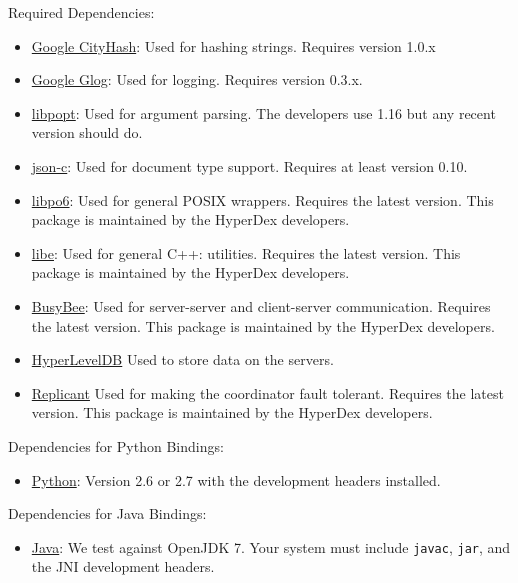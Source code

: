 Required Dependencies:

\begin{itemize}
\item \href{http://code.google.com/p/cityhash/}{Google CityHash}:  Used for
    hashing strings.  Requires version 1.0.x
\item \href{http://code.google.com/p/google-glog/}{Google Glog}:  Used for
    logging.  Requires version 0.3.x.
\item \href{http://rpm5.org/}{libpopt}: Used for argument parsing.  The
    developers use 1.16 but any recent version should do.
\item \href{https://github.com/json-c/json-c}{json-c}:  Used for document type
    support.  Requires at least version 0.10.
\item \href{http://hyperdex.org/downloads/}{libpo6}: Used for general POSIX
    wrappers.  Requires the latest version.  This package is maintained by the
    HyperDex developers.
\item \href{http://hyperdex.org/downloads/}{libe}: Used for general C++:
    utilities.  Requires the latest version.  This package is maintained by the
    HyperDex developers.
\item \href{http://hyperdex.org/downloads/}{BusyBee}: Used for server-server
    and client-server communication.  Requires the latest version.  This package
    is maintained by the HyperDex developers.
\item \href{http://hyperdex.org/downloads/}{HyperLevelDB}  Used to store data
    on the servers.
\item \href{http://hyperdex.org/downloads/}{Replicant} Used for making the
    coordinator fault tolerant.  Requires the latest version.  This package is
    maintained by the HyperDex developers.
\end{itemize}

Dependencies for Python Bindings:

\begin{itemize}
\item \href{http://python.org/}{Python}: Version 2.6 or 2.7 with the
    development headers installed.
\end{itemize}

Dependencies for Java Bindings:

\begin{itemize}
\item \href{http://openjdk.java.net/}{Java}: We test against OpenJDK 7.  Your
    system must include \texttt{javac}, \texttt{jar}, and the JNI development
    headers.
\end{itemize}

